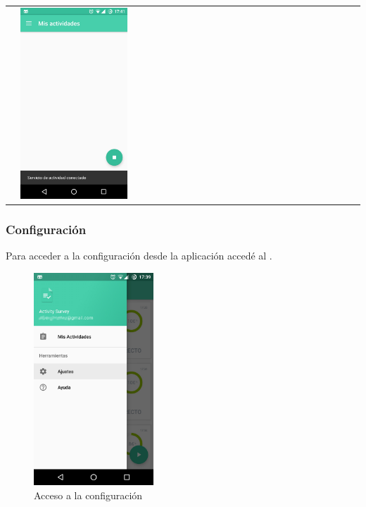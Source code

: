 {\begin{table}[!htbp]
\begin{tabular}{lll}
 & 
    {\includegraphics[width=0.33\textwidth]{anexos/graphics/enabled_serv.jpg}}
\\
\end{tabular}
\end{table}


\subsubsection{Configuración}
\label{config_adic:configuracion}
Para acceder a la configuración desde la aplicación accedé al .
\begin{figure}[!htbp]
\centering
    \includegraphics[width=0.4\textwidth]{anexos/graphics/mnu_config.jpg}
\caption{Acceso a la configuración}\label{config_adic:id1}\end{figure}

}
